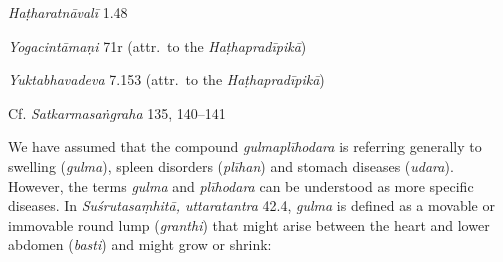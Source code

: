 \begin{ekdosis}

\begin{testimonia}[hp02_027]
\emph{Haṭharatnāvalī} 1.48

\begin{versinnote}
\end{versinnote}

\emph{Yogacintāmaṇi} 71r (attr.~to the \emph{Haṭhapradīpikā})

\begin{versinnote}
\end{versinnote}

\emph{Yuktabhavadeva} 7.153 (attr.~to the \emph{Haṭhapradīpikā})

\begin{versinnote}
\end{versinnote}

Cf. \emph{Satkarmasaṅgraha} 135, 140–141

\begin{versinnote}
\end{versinnote}
\end{testimonia}

\begin{philcomm}[hp02_027]
We have assumed that the compound \emph{gulmaplīhodara} is referring generally to swelling (\emph{gulma}), spleen disorders (\emph{plīhan}) and stomach diseases (\emph{udara}). However, the terms \emph{gulma} and \emph{plīhodara} can be understood as more specific diseases. In \emph{Suśrutasaṃhitā, uttaratantra} 42.4, \emph{gulma} is defined as a movable or immovable round lump (\emph{granthi}) that might arise between the heart and lower abdomen (\emph{basti}) and might grow or shrink:


\end{philcomm}
\end{ekdosis}
